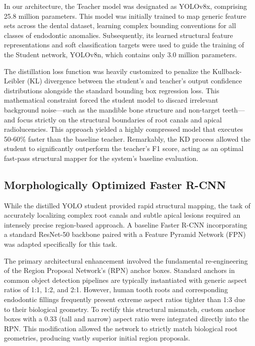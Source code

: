\documentclass[conference]{IEEEtran}
\begin{document}
In our architecture, the Teacher model was designated as YOLOv8x, comprising 25.8 million parameters. This model was initially trained to map generic feature sets across the dental dataset, learning complex bounding conventions for all classes of endodontic anomalies. Subsequently, its learned structural feature representations and soft classification targets were used to guide the training of the Student network, YOLOv8n, which contains only 3.0 million parameters.

The distillation loss function was heavily customized to penalize the Kullback-Leibler (KL) divergence between the student's and teacher's output confidence distributions alongside the standard bounding box regression loss. This mathematical constraint forced the student model to discard irrelevant background noise---such as the mandible bone structure and non-target teeth---and focus strictly on the structural boundaries of root canals and apical radiolucencies. This approach yielded a highly compressed model that executes 50-60\% faster than the baseline teacher. Remarkably, the KD process allowed the student to significantly outperform the teacher's F1 score, acting as an optimal fast-pass structural mapper for the system's baseline evaluation.

\subsection{Morphologically Optimized Faster R-CNN}
While the distilled YOLO student provided rapid structural mapping, the task of accurately localizing complex root canals and subtle apical lesions required an intensely precise region-based approach. A baseline Faster R-CNN incorporating a standard ResNet-50 backbone paired with a Feature Pyramid Network (FPN) was adapted specifically for this task.

The primary architectural enhancement involved the fundamental re-engineering of the Region Proposal Network's (RPN) anchor boxes. Standard anchors in common object detection pipelines are typically instantiated with generic aspect ratios of 1:1, 1:2, and 2:1. However, human tooth roots and corresponding endodontic fillings frequently present extreme aspect ratios tighter than 1:3 due to their biological geometry. To rectify this structural mismatch, custom anchor boxes with a 0.33 (tall and narrow) aspect ratio were integrated directly into the RPN. This modification allowed the network to strictly match biological root geometries, producing vastly superior initial region proposals.
\end{document}
